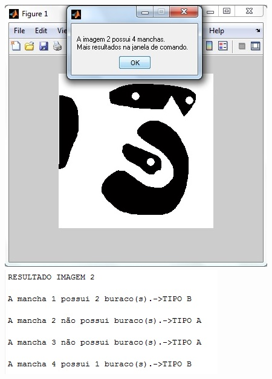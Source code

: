 \documentclass[conference]{IEEEtran}
\begin{document}
\begin{itemize}
		\vspace{2\baselineskip}\vspace{-\parskip}
		\includegraphics[scale=0.64]{images/janela2-2}
		\includegraphics[scale=0.8]{images/comando2}
		\vspace{2\baselineskip}\vspace{-\parskip}


\end{itemize}
\end{document}
